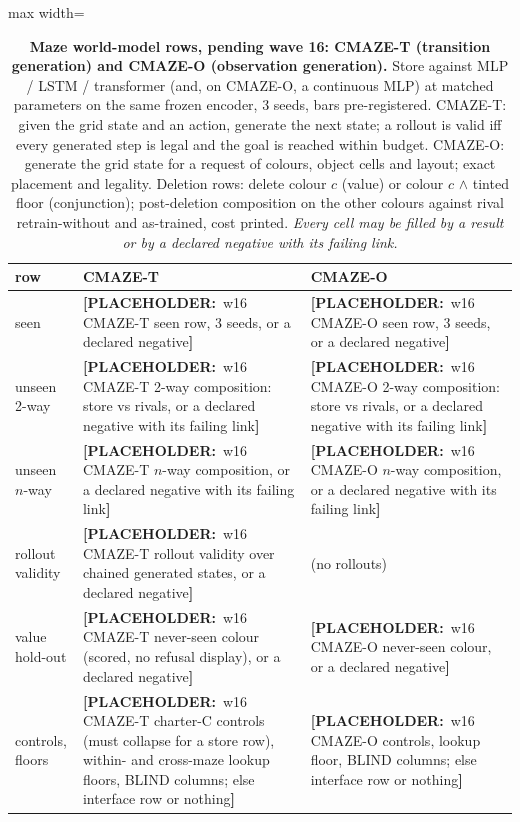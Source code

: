 \documentclass{article}
\newcommand{\PLACEHOLDER}[1]{{\color{red}\textbf{[PLACEHOLDER:}~#1\textbf{]}}}
\begin{document}
\begin{table}[h]
\centering\scriptsize
\caption{\textbf{Maze world-model rows, pending wave 16: CMAZE-T (transition generation) and
CMAZE-O (observation generation).} Store against MLP / LSTM / transformer (and, on CMAZE-O, a
continuous MLP) at matched parameters on the same frozen encoder, 3 seeds, bars pre-registered.
CMAZE-T: given the grid state and an action, generate the next state; a rollout is valid iff every
generated step is legal and the goal is reached within budget. CMAZE-O: generate the grid state for
a request of colours, object cells and layout; exact placement and legality. Deletion rows: delete
colour $c$ (value) or colour $c$ $\wedge$ tinted floor (conjunction); post-deletion composition on
the other colours against rival retrain-without and as-trained, cost printed. \emph{Every cell may
be filled by a result or by a declared negative with its failing link.}}
\label{tab:cmazet}\label{tab:cmaze-del}\label{tab:cmazeo}
\setlength{\tabcolsep}{2pt}
\begin{adjustbox}{max width=\linewidth}\begin{tabular}{p{1.9cm}p{5.6cm}p{5.6cm}}
\toprule
row & CMAZE-T & CMAZE-O \\
\midrule
seen & \PLACEHOLDER{w16 CMAZE-T seen row, 3 seeds, or a declared negative} & \PLACEHOLDER{w16 CMAZE-O seen row, 3 seeds, or a declared negative} \\
unseen 2-way & \PLACEHOLDER{w16 CMAZE-T 2-way composition: store vs rivals, or a declared negative with its failing link} & \PLACEHOLDER{w16 CMAZE-O 2-way composition: store vs rivals, or a declared negative with its failing link} \\
unseen $n$-way & \PLACEHOLDER{w16 CMAZE-T $n$-way composition, or a declared negative with its failing link} & \PLACEHOLDER{w16 CMAZE-O $n$-way composition, or a declared negative with its failing link} \\
rollout validity & \PLACEHOLDER{w16 CMAZE-T rollout validity over chained generated states, or a declared negative} & (no rollouts) \\
value hold-out & \PLACEHOLDER{w16 CMAZE-T never-seen colour (scored, no refusal display), or a declared negative} & \PLACEHOLDER{w16 CMAZE-O never-seen colour, or a declared negative} \\
controls, floors & \PLACEHOLDER{w16 CMAZE-T charter-C controls (must collapse for a store row), within- and cross-maze lookup floors, BLIND columns; else interface row or nothing} & \PLACEHOLDER{w16 CMAZE-O controls, lookup floor, BLIND columns; else interface row or nothing} \\

\end{tabular}
\end{adjustbox}
\end{table}
\end{document}
